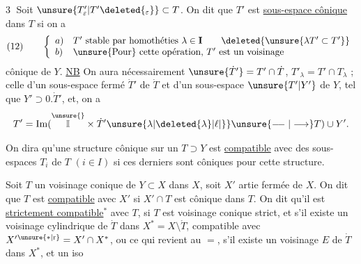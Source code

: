 \textcircled{3} Soit
 $\unsure{T'_\varepsilon|T'\deleted{_\varepsilon}}\subset T$.
On dit que $T'$ est \uline{sous-espace cônique} dans $T$ si on a
\[
(12)\qquad\left\{\begin{array}{ll}
a)&T'\text{ stable par homothéties }\lambda\in\mathbf{I}\qquad
\deleted{\unsure{\lambda T'\subset T'}}\\
b)&\text{\unsure{Pour} cette opération, }T'\text{ est un voisinage}
\end{array}\right.
\]
 cônique de $Y$.
\uline{NB} On aura nécessairement $\unsure{\dot T'}=T'\cap\dot T$,
$T'_\lambda=T'\cap T_\lambda$ ;
celle d'un sous-espace fermé $\dot T'$ de $\dot T$
et d'un sous-espace $\unsure{T'|Y'}$ de $Y$, tel que $Y'\supset0.\dot T'$, et,
on a
\[
T'=\operatorname{Im}(\overset{\unsure{}}{\mathbb{I}}\times
\dot T'\unsure{\lambda|\deleted{\lambda}|\ell|\}}
\unsure{\mathrel{\relbar\joinrel\relbar}|\longrightarrow}T)\cup Y'.
\]

On dira qu'une structure cônique sur
un $T\supset Y$ est \uline{compatible} avec des sous-espaces
 $T_i$ de $T$ $(i\in I)$ si ces derniers
sont côniques pour cette structure.

Soit $T$ un voisinage conique de $Y\subset X$
dans $X$, soit $X'$ artie fermée de $X$. On
dit que $T$ est \uline{compatible} avec $X'$ si
$X'\cap T$ est cônique dans $T$. On dit qu'il
est \uline{strictement compatible}$^{*}$ avec $T$, si
$T$ est voisinage conique strict, et s'il existe
un voisinage cylindrique de $\dot T$ dans
$X^*=X\setminus\mathring T$, compatible avec
$X'{}^{\unsure{*|\mathrm r}}=X'\cap X^*$,
ou ce qui revient au $=$, s'il existe un
voisinage $E$ de $\dot T$ dans $X^*$, et un iso

